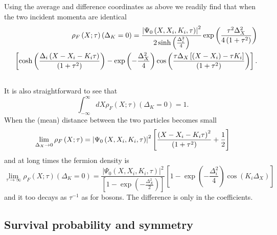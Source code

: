 \documentclass[preprint,aps]{revtex4}
\begin{document}
Using the average and difference coordinates as above we readily find that
when the two incident momenta are identical
\begin{eqnarray}
&&\rho _{F}\left( X;\tau \right) \left( \Delta _{K}=0\right) =\frac{%
\left\vert \Psi _{0}\left( X,X_{i},K_{i},\tau \right) \right\vert ^{2}}{%
2\sinh \left( \frac{\Delta _{i}^{2}}{4}\right) }\exp \left( \frac{\tau
^{2}\Delta _{X}^{2}}{4\left( 1+\tau ^{2}\right) }\right)  \notag \\
&&\left[ \cosh \left( \frac{\Delta _{i}\left( X-X_{i}-K_{i}\tau \right) }{%
\left( 1+\tau ^{2}\right) }\right) -\exp \left( -\frac{\Delta _{X}^{2}}{4}%
\right) \cos \left( \frac{\tau \Delta _{X}\left[ \left( X-X_{i}\right) -\tau
K_{i}\right] }{\left( 1+\tau ^{2}\right) }\right) \right] . \notag \\
&&  \label{2.28}
\end{eqnarray}%
It is also straightforward to see that
\begin{equation}
\int_{-\infty }^{\infty }dX\rho _{F}\left( X;\tau \right) \left( \Delta
_{K}=0\right) =1.  \label{2.29}
\end{equation}%
When the (mean) distance between the two particles becomes small
\begin{equation}
\lim_{\Delta _{X}\rightarrow 0}\rho _{F}\left( X;\tau \right) =\left\vert
\Psi _{0}\left( X,X_{i},K_{i},\tau \right) \right\vert ^{2}\left[ \frac{%
\left( X-X_{i}-K_{i}\tau \right) ^{2}}{\left( 1+\tau ^{2}\right) }+\frac{1}{2%
}\right]  \label{2.30}
\end{equation}%
and at long times the fermion density is\bigskip
\begin{equation}
\lim_{\tau \rightarrow \infty }\rho _{F}\left( X;\tau \right) \left( \Delta
_{K}=0\right) =\frac{\left\vert \Psi _{0}\left( X,X_{i},K_{i},\tau \right)
\right\vert ^{2}}{\left[ 1-\exp \left( -\frac{\Delta _{X}^{2}}{2}\right) %
\right] }\left[ 1-\exp \left( -\frac{\Delta _{i}^{2}}{4}\right) \cos \left(
K_{i}\Delta _{X}\right) \right]  \label{2.31}
\end{equation}%
and it too decays as $\tau ^{-1}$ as for bosons. The difference is only in
the coefficients.

\subsection{Survival probability and symmetry}
\end{document}

